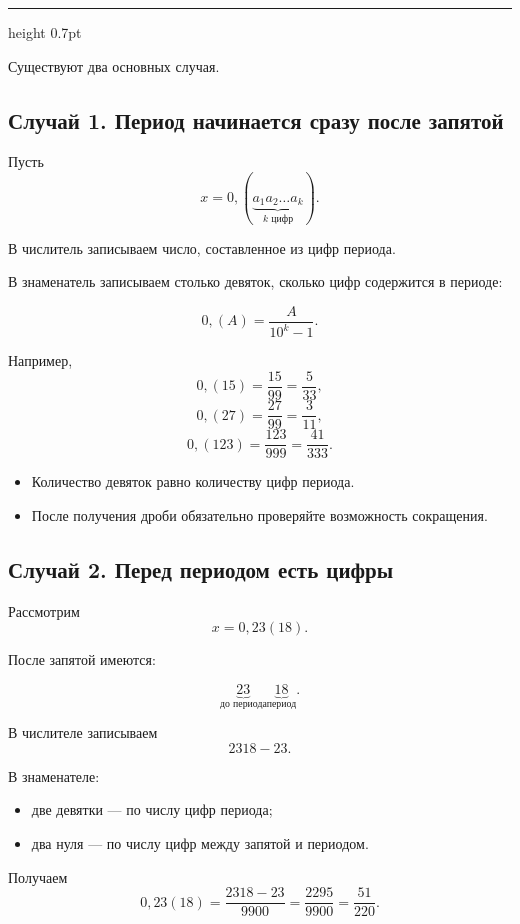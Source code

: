 \documentclass[a4paper,12pt]{article}
\newcommand{\checkitem}{\(\square\)}
\newcommand{\ruleline}{%
    \par\medskip
    {\color{accent}\hrule height 0.7pt}
    \medskip
}
\begin{document}
\ruleline

Существуют два основных случая.

\subsection*{\textcolor{darkaccent}{Случай 1. Период начинается сразу после запятой}}

Пусть
\[
x=0{,}(\underbrace{a_1a_2\ldots a_k}_{k\text{ цифр}}).
\]

В числитель записываем число, составленное из цифр периода.

В знаменатель записываем столько девяток, сколько цифр содержится
в периоде:

\[
0{,}(A)=\frac{A}{10^k-1}.
\]

Например,
\[
0{,}(15)=\frac{15}{99}=\frac{5}{33},
\]
\[
0{,}(27)=\frac{27}{99}=\frac{3}{11},
\]
\[
0{,}(123)=\frac{123}{999}=\frac{41}{333}.
\]

\begin{itemize}
    \item[\checkitem] Количество девяток равно количеству цифр периода.
    \item[\checkitem] После получения дроби обязательно проверяйте возможность сокращения.
\end{itemize}


\subsection*{\textcolor{darkaccent}{Случай 2. Перед периодом есть цифры}}

Рассмотрим
\[
x=0{,}23(18).
\]

После запятой имеются:

\[
\underbrace{23}_{\text{до периода}}
\underbrace{18}_{\text{период}}.
\]

В числителе записываем
\[
2318-23.
\]

В знаменателе:

\begin{itemize}
    \item две девятки --- по числу цифр периода;
    \item два нуля --- по числу цифр между запятой и периодом.
\end{itemize}

Получаем
\[
0{,}23(18)
=
\frac{2318-23}{9900}
=
\frac{2295}{9900}
=
\frac{51}{220}.
\]
\end{document}
